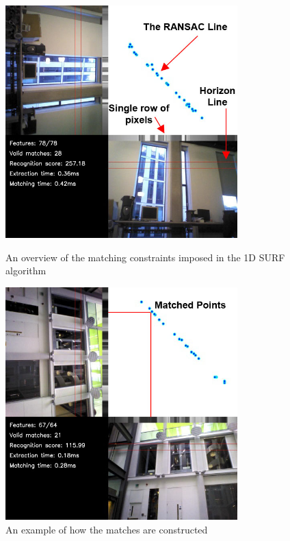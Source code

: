 \documentclass[11pt]{report}
\begin{document}
\begin{figure}[ht!]
\begin{minipage}[b]{0.5\linewidth}
  \centering
    \includegraphics[width=0.8\textwidth]{../Drawings/constraints/matchingLabelled.jpg}
    \caption{An overview of the matching constraints imposed in the 1D SURF algorithm} 
    \label{fig:ransacOverview}
\end{minipage}
\begin{minipage}[b]{0.5\linewidth}
  \centering
    \includegraphics[width=0.8\textwidth]{../Drawings/constraints/matchedPoints.jpg}
    \caption{An example of how the matches are constructed} 
    \label{fig:ransacExample}
\end{minipage}
\end{figure}
\end{document}
